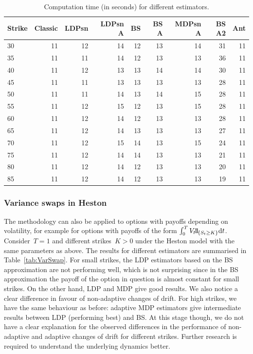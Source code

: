 \begin{table}[htbp]
\centering
\begin{tabular}{lrrrrrrrr}
\toprule
Strike &  Classic &  LDPsn &  LDPsn A &  BS &  BS A &  MDPsn A &  BS A2 &  Ant \\
\midrule
30 &       11 &     12 &       14 &  12 &    13 &           14  &     31 &   11 \\
35 &       11 &     11 &       14 &  12 &    13 &           13  &     36 &   11 \\
40 &       11 &     12 &       13 &  13 &    14 &           14  &     30 &   11 \\
45 &       11 &     11 &       13 &  13 &    13 &           13  &     28 &   11 \\
50 &       11 &     11 &       14 &  13 &    14 &           15  &     28 &   11 \\
55 &       11 &     12 &       15 &  12 &    13 &           15  &     28 &   11 \\
60 &       11 &     12 &       14 &  12 &    13 &           13  &     28 &   11 \\
65 &       11 &     12 &       14 &  13 &    13 &           13  &     27 &   11 \\
70 &       11 &     12 &       15 &  14 &    13 &           15  &     24 &   11 \\
75 &       11 &     12 &       14 &  14 &    13 &           13  &     21 &   11 \\
80 &       11 &     12 &       14 &  12 &    13 &           13  &     20 &   11 \\
85 &       11 &     12 &       14 &  12 &    13 &           13  &     19 &   11 \\
\bottomrule
\end{tabular}
\bigskip
\caption{Computation time (in seconds) for different estimators.}\label{tab:CompTime}
\end{table}

\subsubsection{Variance swaps in Heston}
The methodology can also be applied to options with payoffs depending on volatility,
for example for options with payoffs of the form
$\int_0^T V_t \ind_{\{S_t\geq K\}}\D t$.
Consider~$T = 1$ and different strikes~$K>0$ under the Heston model with the same parameters as above. The results for different estimators are summarised in Table~\ref{tab:VarSwap}.
For small strikes, the LDP estimators based on the BS approximation are not performing well, which is not surprising since in the BS approximation the payoff of the option in question is almost constant for small strikes. On the other hand, LDP and MDP give good results. We also notice a clear difference in favour of non-adaptive changes of drift.
For high strikes, we have the same behaviour as before: adaptive MDP estimators give intermediate results between LDP (performing best) and BS. At this stage though, we do not have a clear explanation for the observed differences in the performance of non-adaptive and adaptive changes of drift for different strikes. Further research is required to understand the underlying dynamics better.

